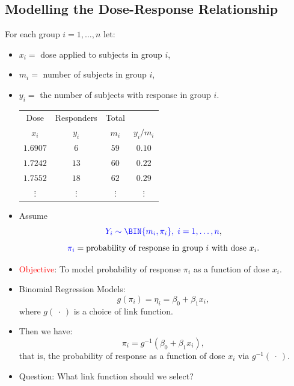 \documentclass{article}\usepackage[]{graphicx}\usepackage[svgnames]{xcolor}
\begin{document}
\subsection*{Modelling the Dose-Response Relationship}
For each group $ i=1,\ldots,n $ let:
\begin{itemize}
      \item $ x_i= $ dose applied to subjects in group $ i $,
      \item $ m_i= $ number of subjects in group $ i $,
      \item $ y_i= $ the number of subjects with response in group $ i $.
            \begin{table}[!htbp]
                  \centering
                  \begin{tabular}{cccc}
                        \toprule
                        Dose       & Responders & Total                  \\
                        $ x_i $    & $ y_i $    & $ m_i $  & $ y_i/m_i $ \\
                        \midrule
                        $ 1.6907 $ & $ 6 $      & $ 59 $   & $ 0.10 $    \\
                        $ 1.7242 $ & $ 13 $     & $ 60 $   & $ 0.22 $    \\
                        $ 1.7552 $ & $ 18 $     & $ 62 $   & $ 0.29 $    \\
                        $\vdots$   & $\vdots$   & $\vdots$ & $\vdots$    \\
                        \bottomrule
                  \end{tabular}
            \end{table}
      \item Assume
            \[ \textcolor{Blue}{Y_i \sim \BIN{m_i,\pi_i},\; i=1,\ldots,n}, \]
            \[ \textcolor{Blue}{\pi_i} = \text{probability of response in group $ i $ with dose $ x_i $}. \]
      \item \textcolor{Red}{Objective}: To model probability of response $ \pi_i $ as a function of dose $ x_i $.
      \item Binomial Regression Models:
            \[ g(\pi_i)=\eta_i=\beta_0+\beta_1x_i, \]
            where $ g(\:\cdot\:) $ is a choice of link function.
      \item Then we have:
            \[ \pi_i=g^{-1}(\beta_0+\beta_1x_i), \]
            that is, the probability of response as a function of dose $ x_i $ via $ g^{-1}(\:\cdot\:) $.
      \item Question: What link function should we select?

\end{itemize}
\end{document}
